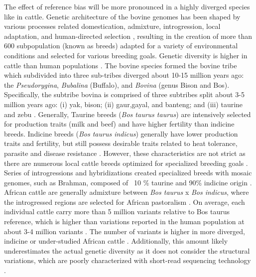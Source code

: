 \documentclass[../main.tex]{subfiles}
\begin{document}
The effect of reference bias will be more pronounced in a highly diverged species like in cattle. Genetic architecture of the bovine genomes has been shaped by various processes related domestication, admixture, introgression, local adaptation, and human-directed selection \citep{zhang2020evolution}, resulting in the creation of more than 600 subpopulation (known as breeds) adapted for a variety of environmental conditions and selected for various breeding goals. Genetic diversity is higher in cattle than human populations \citep{charlier2016ngs}. The bovine species formed the bovine tribe which subdivided into three sub-tribes diverged about 10-15 million years ago: the \emph{Pseudorygina},\emph{ Bubalina} (Buffalo), and \emph{Bovina} (genus Bison and Bos). Specifically, the subtribe bovina is comprised of three subtribes split about 3-5 million years ago: (i) yak, bison; (ii) gaur,gayal, and banteng; and (iii) taurine and zebu \citep{pitt2019domestication}. Generally, Taurine breeds (\emph{Bos taurus taurus}) are intensively selected for production traits (milk and beef) and have higher fertility than indicine breeds. Indicine breeds (\emph{Bos taurus indicus})  generally have lower production traits and fertility, but still possess desirable traits related to heat tolerance, parasite and disease resistance \citep{Low2020}. However, these characteristics are not strict as there are numerous local cattle breeds optimized for specialized breeding goals \citep{signer2017population,upadhyay2019genomic}. Series of introgressions and hybridizations created specialized breeds with mosaic genomes, such as Brahman, composed of ~10 \% taurine and 90\% indicine origin \citep{koufariotis2018sequencing}. African cattle are generally admixture between \emph{Bos taurus} x \emph{Bos indicus}, where the introgressed regions are selected for African pastoralism \citep{kim2020mosaic}. On average, each individual cattle carry more than 5 million variants relative to Bos taurus reference, which is higher than variations reported in the human population at about 3-4 million variants \citep{daetwyler2014whole,sudmant2015integrated}. The number of variants is higher in more diverged, indicine \citep{koufariotis2018sequencing} or under-studied African cattle \citep{kim2020mosaic,kim2017genome}. Additionally, this amount likely underestimates the actual genetic diversity as it does not consider the structural variations, which are poorly characterized with short-read sequencing technology \citep{mahmoud2019structural,chaisson2019multi}. 
\end{document}

